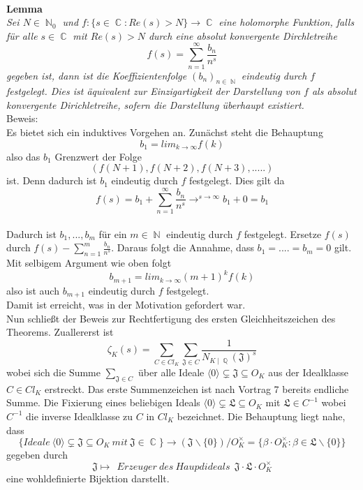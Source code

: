 \documentclass[10pt,a4paper]{article}
\DeclareMathOperator{\C}{\mathbb{C}}
\DeclareMathOperator{\Q}{\mathbb{Q}}
\DeclareMathOperator{\N}{\mathbb{N}}
\begin{document}
 \\
 \textbf{Lemma}
 \\
 \textit{Sei $N \in \N_0$ und $f \colon \{s \in \C \colon Re(s)>N\}\rightarrow \C$ eine holomorphe Funktion, falls für alle $s \in \C$ mit $Re(s) >N$ durch eine absolut konvergente Dirchletreihe $$f(s) = \sum_{n=1}^{\infty}\frac{b_n}{n^s}$$gegeben ist, dann ist die Koeffizientenfolge $(b_n)_{n \in \N}$ eindeutig durch $f$ festgelegt. Dies ist äquivalent zur Einzigartigkeit der Darstellung von $f$ als absolut konvergente Dirichletreihe, sofern die Darstellung überhaupt existiert.}
 \\
 Beweis:
 \\
 Es bietet sich ein induktives Vorgehen an.
Zunächst steht die Behauptung $$b_1= lim_{k \to \infty} f(k)$$also das $b_1$ Grenzwert der Folge $$(f(N+1),f(N+2),f(N+3),.....)$$ ist. Denn dadurch ist $b_1$ eindeutig durch $f$ festgelegt. Dies gilt da $$f(s)=b_1+\sum_{n=1}^{\infty} \frac{b_n}{n^s}\rightarrow^{s \to \infty} b_1 + 0 = b_1$$
\\ 
Dadurch ist $b_1,...,b_m$ für ein $m \in \N$ eindeutig durch $f$ festgelegt. Ersetze $f(s)$ durch $f(s)-\sum_{n=1}^{m}\frac{b_n}{n^s}$. Daraus folgt die Annahme, dass $b_1=....=b_m=0$ gilt. Mit selbigem Argument wie oben folgt $$b_{m+1}=lim_{k\to \infty}(m+1)^k f(k)$$ also ist auch $b_{m+1}$ eindeutig durch $f$ festgelegt.
\\
Damit ist erreicht, was in der Motivation gefordert war.
\\
Nun schließt der Beweis zur Rechtfertigung des ersten Gleichheitszeichen des Theorems. Zuallererst ist $$\zeta_K(s) = \sum_{C \in Cl_K}\sum_{\mathfrak{J} \in C}\frac{1}{N_{K\mid \Q}(\mathfrak{J})^s}$$wobei sich die Summe $\sum_{\mathfrak{J} \in C}$ über alle Ideale $\langle 0 \rangle \subsetneq \mathfrak{J} \subseteq O_K$ aus der Idealklasse $C \in Cl_K$ erstreckt. Das erste Summenzeichen ist nach Vortrag 7 bereits endliche Summe. Die Fixierung eines beliebigen Ideals $\langle 0 \rangle \subsetneq \mathfrak{L} \subseteq O_K$ mit $\mathfrak{L}\in C^{-1}$ wobei $C^{-1}$ die inverse Idealklasse zu $C$ in $Cl_K$ bezeichnet. Die Behauptung liegt nahe, dass  $$\{Ideale \ \langle 0 \rangle \subsetneq \mathfrak{J} \subseteq O_K \ mit \ \mathfrak{J} \in \C\}\rightarrow(\mathfrak{J}\backslash\{0\})/O_K^{\times}=\{ \beta \cdot O_K^{\times} \colon \beta \in \mathfrak{L}\backslash\{ 0\}\}$$ gegeben durch $$\mathfrak{J}\mapsto \ \ Erzeuger\ des\ Haupdideals \ \ \mathfrak{J\cdot L}\cdot O_K^{\times}$$ eine wohldefinierte Bijektion darstellt. \\
\end{document}
